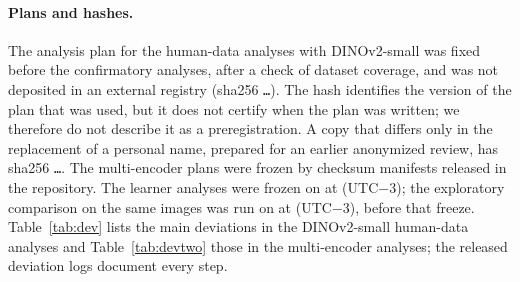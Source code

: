 \documentclass[11pt]{article}
\begin{document}
\paragraph{Plans and hashes.} The analysis plan for the human-data analyses with DINOv2-small was fixed before the confirmatory analyses, after a check of dataset coverage, and was not deposited in an external registry (sha256 \texttt{\PlanHash\ldots}). The hash identifies the version of the plan that was used, but it does not certify when the plan was written; we therefore do not describe it as a preregistration. A copy that differs only in the replacement of a personal name, prepared for an earlier anonymized review, has sha256 \texttt{\PlanHashAnon\ldots}. The multi-encoder plans were frozen by checksum manifests released in the repository. The learner analyses were frozen on \VtFreezeDate{} at \VtFreezeTime{} (UTC$-$3); the exploratory comparison on the same images was run on \VtXtDate{} at \VtXtTime{} (UTC$-$3), before that freeze. Table~\ref{tab:dev} lists the main deviations in the DINOv2-small human-data analyses and Table~\ref{tab:devtwo} those in the multi-encoder analyses; the released deviation logs document every step.
\end{document}
